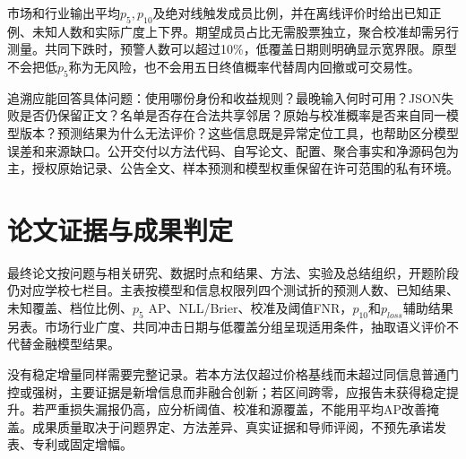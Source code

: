 
市场和行业输出平均$p_5,p_{10}$及绝对线触发成员比例，并在离线评价时给出已知正例、未知人数和实际广度上下界。期望成员占比无需股票独立，聚合校准却需另行测量。共同下跌时，预警人数可以超过10\%，低覆盖日期则明确显示宽界限。原型不会把低$p_5$称为无风险，也不会用五日终值概率代替周内回撤或可交易性。

追溯应能回答具体问题：使用哪份身份和收益规则？最晚输入何时可用？JSON失败是否仍保留正文？名单是否存在合法共享邻居？原始与校准概率是否来自同一模型版本？预测结果为什么无法评价？这些信息既是异常定位工具，也帮助区分模型误差和来源缺口。公开交付以方法代码、自写论文、配置、聚合事实和净源码包为主，授权原始记录、公告全文、样本预测和模型权重保留在许可范围的私有环境。

\section{论文证据与成果判定}
最终论文按问题与相关研究、数据时点和结果、方法、实验及总结组织，开题阶段仍对应学校七栏目。主表按模型和信息权限列四个测试折的预测人数、已知结果、未知覆盖、档位比例、$p_5$ AP、NLL/Brier、校准及阈值FNR，$p_{10}$和$p_{loss}$辅助结果另表。市场行业广度、共同冲击日期与低覆盖分组呈现适用条件，抽取语义评价不代替金融模型结果。

没有稳定增量同样需要完整记录。若本方法仅超过价格基线而未超过同信息普通门控或强树，主要证据是新增信息而非融合创新；若区间跨零，应报告未获得稳定提升。若严重损失漏报仍高，应分析阈值、校准和源覆盖，不能用平均AP改善掩盖。成果质量取决于问题界定、方法差异、真实证据和导师评阅，不预先承诺发表、专利或固定增幅。
